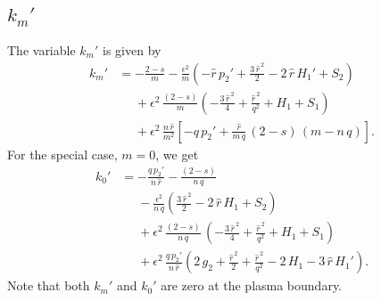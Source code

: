 \documentclass[12pt,prb,aps,notitlepage]{revtex4-1}
\begin{document}
\subsection{$k_m'$}
The variable $k_m'$ is given by 
\begin{align}
k_m'&= -\frac{2-s}{m}
-\frac{\epsilon^2}{m}\left(-\hat{r}\,p_2'+
\frac{3\,\hat{r}^{\,2}}{2}-2\,\hat{r}\,H_1' +S_2\right)\nonumber\\[0.5ex]
&\phantom{=}
+\epsilon^2\,\frac{(2-s)}{m}\left(-\frac{3\,\hat{r}^{\,2}}{4} +\frac{\hat{r}^{\,2}}{q^2}+H_1+S_1\right)\nonumber\\[0.5ex]
&\phantom{=}
+\epsilon^2\,\frac{n\,\hat{r}}{m^2}\left[-q\,p_2' + \frac{\hat{r}}{m\,q}\,(2-s)\,(m-n\,q)\right].
\end{align}
For the special case, $m=0$, we get
\begin{align}
k_0' &= - \frac{q\,p_2'}{n\,\hat{r}} - \frac{(2-s)}{n\,q} 
\nonumber\\[0.5ex]
&\phantom{=}-\frac{\epsilon^2}{n\,q}\left(
\frac{3\,\hat{r}^{\,2}}{2}-2\,\hat{r}\,H_1+S_2\right)\nonumber\\[0.5ex]
&\phantom{=}
+\epsilon^2\,\frac{(2-s)}{n\,q}\,\left(-\frac{3\,\hat{r}^{\,2}}{4} +\frac{\hat{r}^{\,2}}{q^2}+H_1 +S_1\right)\nonumber\\[0.5ex]
&\phantom{=}
+\epsilon^2\,\frac{q\,p_2'}{n\,\hat{r}}\left(2\,g_2+\frac{\hat{r}^{\,2}}{2}+\frac{\hat{r}^{\,2}}{q^2}-2\,H_1-3\,\hat{r}\,H_1'\right).
\end{align}
Note that both $k_m'$ and $k_0'$ are zero at the plasma boundary. 
\end{document}
